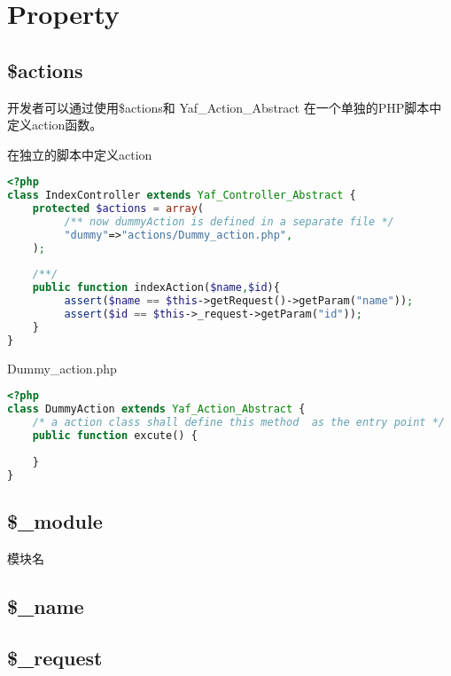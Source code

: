 \section{Property}


\subsection{\$actions}

开发者可以通过使用\$actions和 Yaf\_Action\_Abstract 在一个单独的PHP脚本中定义action函数。



\begin{example}
在独立的脚本中定义action
\begin{lstlisting}[language=PHP]
<?php
class IndexController extends Yaf_Controller_Abstract {
    protected $actions = array(
         /** now dummyAction is defined in a separate file */
         "dummy"=>"actions/Dummy_action.php",
    );
    
    /**/
    public function indexAction($name,$id){
         assert($name == $this->getRequest()->getParam("name"));
         assert($id == $this->_request->getParam("id"));
    }
}
\end{lstlisting}
\end{example}

\begin{example}
Dummy\_action.php
\begin{lstlisting}[language=PHP]
<?php
class DummyAction extends Yaf_Action_Abstract {
    /* a action class shall define this method  as the entry point */
    public function excute() {
    
    }
}
\end{lstlisting}
\end{example}

\subsection{\$\_module}

模块名

\subsection{\$\_name}



\subsection{\$\_request}

